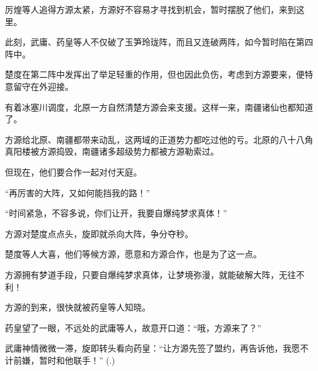 \begin{this_body}
厉煌等人追得方源太紧，方源好不容易才寻找到机会，暂时摆脱了他们，来到这里。

此刻，武庸、药皇等人不仅破了玉笋玲珑阵，而且又连破两阵，如今暂时陷在第四阵中。

楚度在第二阵中发挥出了举足轻重的作用，但也因此负伤，考虑到方源要来，便特意留守在外迎接。

有着冰塞川调度，北原一方自然清楚方源会来支援。这样一来，南疆诸仙也都知道了。

方源给北原、南疆都带来动乱，这两域的正道势力都吃过他的亏。北原的八十八角真阳楼被方源捣毁，南疆诸多超级势力都被方源勒索过。

但现在，他们要合作一起对付天庭。

“再厉害的大阵，又如何能挡我的路！”

“时间紧急，不容多说，你们让开，我要自爆纯梦求真体！”

方源对楚度点点头，旋即就杀向大阵，争分夺秒。

楚度等人大喜，他们等候方源，愿意和方源合作，也是为了这一点。

方源拥有梦道手段，只要自爆纯梦求真体，让梦境弥漫，就能破解大阵，无往不利！

方源的到来，很快就被药皇等人知晓。

药皇望了一眼，不远处的武庸等人，故意开口道：“哦，方源来了？”

武庸神情微微一滞，旋即转头看向药皇：“让方源先签了盟约，再告诉他，我愿不计前嫌，暂时和他联手！”	 (.)

\end{this_body}

